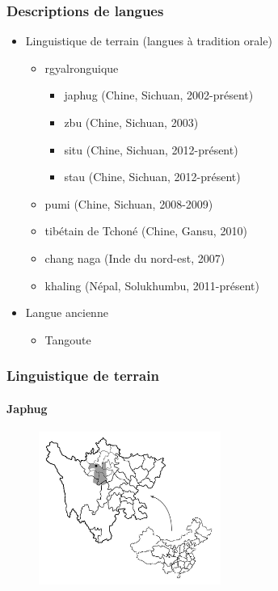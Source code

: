 \documentclass[xcolor=table]{beamer}
\begin{document}
   \begin{frame} 
 \frametitle{Descriptions de langues} 
  \begin{itemize}
\item Linguistique de terrain (langues à tradition orale)
 \begin{itemize}%
 \item rgyalronguique
  \begin{itemize}
\item japhug (Chine, Sichuan, 2002-présent)  
\item zbu (Chine, Sichuan, 2003)
\item situ (Chine, Sichuan, 2012-présent)
\item stau (Chine, Sichuan, 2012-présent)
\end{itemize}
\item pumi (Chine, Sichuan, 2008-2009)
\item tibétain de Tchoné (Chine, Gansu, 2010) 
\item chang naga (Inde du nord-est, 2007)
\item khaling (Népal, Solukhumbu, 2011-présent)
\end{itemize}
\item Langue ancienne
 \begin{itemize}%
\item Tangoute
\end{itemize}
\end{itemize}

\end{frame} 
   
      \begin{frame} 
 \frametitle{Linguistique de terrain} 
  \framesubtitle{Japhug} 
    \begin{figure}[H]
\centering
\includegraphics[height=50mm]{carte.JPG}
\end{figure}   
       \end{frame} 
       
\end{document}
